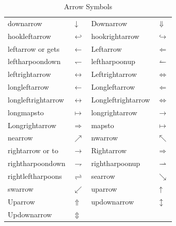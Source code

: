 \begin{table}[tbhp]
\caption{Arrow Symbols}
\label{tab:arrows}
\centering
\begin{tabular}{llll}
\gls{downarrow} & $\downarrow$ &
\gls{Downarrow} & $\Downarrow$ \\
\gls{hookleftarrow} & $\hookleftarrow$ &
\gls{hookrightarrow} & $\hookrightarrow$ \\
\gls{leftarrow} or \gls{gets} & $\leftarrow$ &
\gls{Leftarrow} & $\Leftarrow$ \\
\gls{leftharpoondown} & $\leftharpoondown$ &
\gls{leftharpoonup} & $\leftharpoonup$ \\
\gls{leftrightarrow} & $\leftrightarrow$ &
\gls{Leftrightarrow} & $\Leftrightarrow$ \\
\gls{longleftarrow} & $\longleftarrow$ &
\gls{Longleftarrow} & $\Longleftarrow$ \\
\gls{longleftrightarrow} & $\longleftrightarrow$ &
\gls{Longleftrightarrow} & $\Longleftrightarrow$ \\
\gls{longmapsto} & $\longmapsto$ &
\gls{longrightarrow} & $\longrightarrow$ \\
\gls{Longrightarrow} & $\Longrightarrow$ &
\gls{mapsto} & $\mapsto$ \\
\gls{nearrow} & $\nearrow$ &
\gls{nwarrow} & $\nwarrow$ \\
\gls{rightarrow} or \gls{to} & $\to$ &
\gls{Rightarrow} & $\Rightarrow$ \\
\gls{rightharpoondown} & $\rightharpoondown$ &
\gls{rightharpoonup} & $\rightharpoonup$ \\
\gls{rightleftharpoons} & $\rightleftharpoons$ &
\gls{searrow} & $\searrow$ \\
\gls{swarrow} & $\swarrow$ &
\gls{uparrow} & $\uparrow$ \\
\gls{Uparrow} & $\Uparrow$ &
\gls{updownarrow} & $\updownarrow$ \\
\gls{Updownarrow} & $\Updownarrow$ &
\end{tabular}
\end{table}

